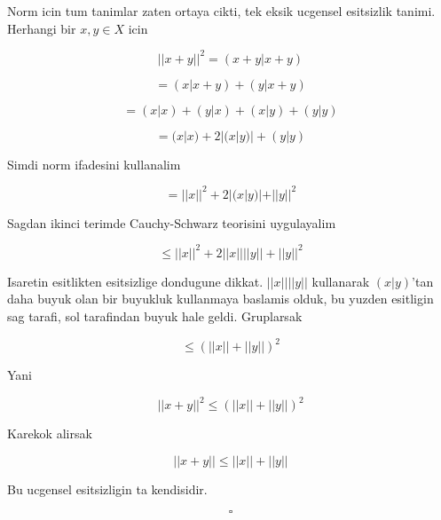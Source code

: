 \documentclass[12pt,fleqn]{article}\usepackage{../common}
\begin{document}
Norm icin tum tanimlar zaten ortaya cikti, tek eksik ucgensel esitsizlik
tanimi. Herhangi bir $x,y \in X$ icin 

\[ ||x+y||^2 = (x+y|x+y) \]

\[ = (x|x+y) + (y|x+y) \]

\[ = (x|x) + (y|x) + (x|y) + (y|y) \]

\[ = (x|x) + 2|(x|y)| + (y|y) \]

Simdi norm ifadesini kullanalim

\[ = ||x||^2 + 2|(x|y)| + ||y||^2 \]

Sagdan ikinci terimde  Cauchy-Schwarz teorisini uygulayalim

\[ \le ||x||^2 + 2||x||||y|| + ||y||^2 \]

Isaretin esitlikten esitsizlige dondugune dikkat. $||x||||y||$ kullanarak
$(x|y)$'tan daha buyuk olan bir buyukluk kullanmaya baslamis olduk, bu
yuzden esitligin sag tarafi, sol tarafindan buyuk hale geldi. Gruplarsak

\[ \le (||x||+||y||)^2  \]

Yani

\[ ||x+y||^2 \le (||x||+||y||)^2  \]

Karekok alirsak 

\[ ||x+y|| \le ||x||+||y||  \]

Bu ucgensel esitsizligin ta kendisidir. 

\[ \square \]
\end{document}
